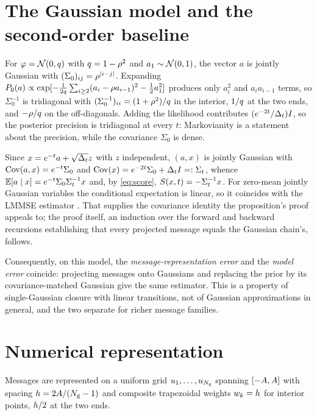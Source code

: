 \section{The Gaussian model and the second-order baseline}
\label{app:lmmse}

For $\varphi=\mathcal{N}\!\left(0,q\right)$ with $q=1-\rho^2$ and $a_1\sim\mathcal{N}\!\left(0,1\right)$, the vector $a$
is jointly Gaussian with $(\Sigma_0)_{ij}=\rho^{|i-j|}$. Expanding
$P_0(a)\propto\exp[-\tfrac{1}{2q}\sum_{i\ge2}(a_i-\rho a_{i-1})^2 - \tfrac12 a_1^2]$
produces only $a_i^2$ and $a_ia_{i-1}$ terms, so $\Sigma_0^{-1}$ is tridiagonal with
$(\Sigma_0^{-1})_{ii} = (1+\rho^2)/q$ in the interior, $1/q$ at the two ends, and
$-\rho/q$ on the off-diagonals. Adding the likelihood contributes $(e^{-2t}/\Delta_t)I$, so the
posterior precision is tridiagonal at every $t$: Markovianity is a statement about the precision,
while the covariance $\Sigma_0$ is dense.

Since $x = e^{-t}a + \sqrt{\Delta_t}z$ with $z$ independent, $(a,x)$ is jointly Gaussian with
$\operatorname{Cov}(a,x) = e^{-t}\Sigma_0$ and $\operatorname{Cov}(x) = e^{-2t}\Sigma_0 + \Delta_t I =: \Sigma_t$, whence
$\mathbb{E}[a\mid x] = e^{-t}\Sigma_0\Sigma_t^{-1}x$ and, by \eqref{eq:score},
$S(x,t) = -\Sigma_t^{-1}x$. For zero-mean jointly Gaussian variables the conditional
expectation is linear, so it coincides with the LMMSE estimator \citep{kay1993}. That supplies the
covariance identity the proposition's proof appeals to; the proof itself, an induction over the
forward and backward recursions establishing that every projected message equals the Gaussian
chain's, follows.



Consequently, on this model, the \emph{message-representation error} and the \emph{model error}
coincide: projecting messages onto Gaussians and replacing the prior by its covariance-matched
Gaussian give the same estimator. This is a property of single-Gaussian closure with linear
transitions, not of Gaussian approximations in general, and the two separate for richer message
families.

\section{Numerical representation}
\label{app:numerics}

Messages are represented on a uniform grid $u_{1},\dots,u_{N_{\mathrm{g}}}$ spanning
$[-A,A]$ with spacing $h = 2A/(N_{\mathrm{g}}-1)$ and composite
trapezoidal weights $w_k = h$ for interior points, $h/2$ at the two ends.

